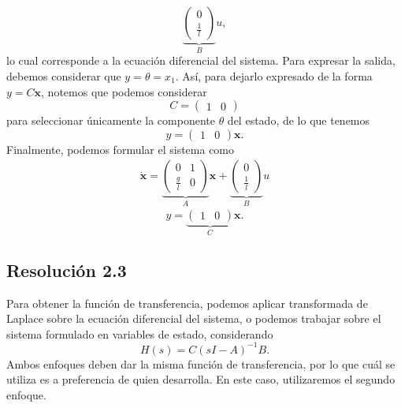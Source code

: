 \documentclass[
  11pt,
  letterpaper,
   addpoints,
  answers
  ]{exam}
\begin{document}
\begin{questions}
\begin{solution}
\begin{equation}
\underbrace{\begin{pmatrix}
0\\[2pt]
\frac{1}{l}
\end{pmatrix}}_{B}u,
\end{equation}
lo cual corresponde a la ecuación diferencial del sistema. Para expresar la salida, debemos considerar que $y=\theta= x_1$. Así, para dejarlo expresado de la forma $y=C\mathbf{x}$, notemos que podemos considerar
\begin{equation}
C=\begin{pmatrix}1&0\end{pmatrix}
\end{equation}
para seleccionar únicamente la componente $\theta$ del estado, de lo que tenemos
\begin{equation}
y=\begin{pmatrix}1&0\end{pmatrix}\mathbf{x}.
\end{equation}
Finalmente, podemos formular el sistema como
\begin{align}
\dot{\mathbf{x}} =
\underbrace{\begin{pmatrix}
0 & 1 \\[2pt]
\frac{g}{l} & 0
\end{pmatrix}}_{A} \mathbf{x} +
\underbrace{\begin{pmatrix}
0 \\[2pt]
\frac{1}{l}
\end{pmatrix}}_{B} u
\end{align}
\begin{equation}
y = \underbrace{\begin{pmatrix}1 & 0\end{pmatrix}}_{C} \mathbf{x}.
\end{equation}

\subsection*{Resolución 2.3}

Para obtener la función de transferencia, podemos aplicar transformada de Laplace sobre la ecuación diferencial del sistema, o podemos trabajar sobre el sistema formulado en variables de estado, considerando
\begin{equation}
H(s)=C(sI-A)^{-1}B.
\end{equation}
Ambos enfoques deben dar la misma función de transferencia, por lo que cuál se utiliza es a preferencia de quien desarrolla. En este caso, utilizaremos el segundo enfoque.


\end{solution}
\end{questions}
\end{document}
